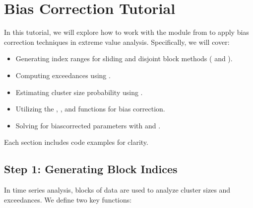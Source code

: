 \documentclass[a4paper,11pt,openany,english]{sphinxmanual}
\begin{document}
\sphinxstepscope


\chapter{Bias Correction Tutorial}
\label{\detokenize{biascorrection:bias-correction-tutorial}}\label{\detokenize{biascorrection::doc}}
\sphinxAtStartPar
In this tutorial, we will explore how to work with the  module from  to apply bias correction techniques in extreme value analysis. Specifically, we will cover:
\begin{itemize}
\item {} 
\sphinxAtStartPar
Generating index ranges for sliding and disjoint block methods ( and ).

\item {} 
\sphinxAtStartPar
Computing exceedances using .

\item {} 
\sphinxAtStartPar
Estimating cluster size probability using .

\item {} 
\sphinxAtStartPar
Utilizing the , , and  functions for bias correction.

\item {} 
\sphinxAtStartPar
Solving for bias\sphinxhyphen{}corrected parameters with  and .

\end{itemize}

\sphinxAtStartPar
Each section includes code examples for clarity.


\section{Step 1: Generating Block Indices}
\label{\detokenize{biascorrection:step-1-generating-block-indices}}
\sphinxAtStartPar
In time series analysis, blocks of data are used to analyze cluster sizes and exceedances. We define two key functions:
\end{document}
